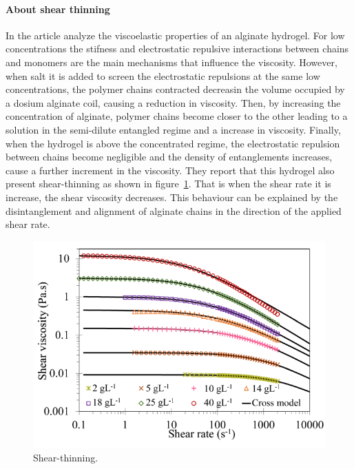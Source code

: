 \paragraph{About shear thinning}
In the article\citep{varela-feijooMultiscaleInvestigationViscoelastic2023} analyze the viscoelastic properties of an alginate hydrogel.
For low concentrations the stifness and electrostatic repulsive interactions between chains and monomers are the main mechanisms that influence the viscosity.
However, when salt it is added to screen the electrostatic repulsions at the same low concentrations, the polymer chains contracted decreasin the volume occupied by a dosium alginate coil, causing a reduction in viscosity.
Then, by increasing the concentration of alginate, polymer chains become closer to the other leading to a solution in the semi-dilute entangled regime and a increase in viscosity.
Finally, when the hydrogel is above the concentrated regime, the electrostatic repulsion between chains become negligible and the density of entanglements increases, cause a further increment in the viscosity.
They report that this hydrogel also present shear-thinning as shown in figure~\ref{fig:hydroMechResponse2}.
That is when the shear rate it is increase, the shear viscosity decreases.
This behaviour can be explained by the disintanglement and alignment of alginate chains in the direction of the applied shear rate.

\begin{figure}[ht!]
    \centering
    \includegraphics[width=12cm]{figs/explainMechResponse/alginateShearThinning.png}
    \caption{Shear-thinning\citep{varela-feijooMultiscaleInvestigationViscoelastic2023}.}\label{fig:hydroMechResponse2}
\end{figure}


